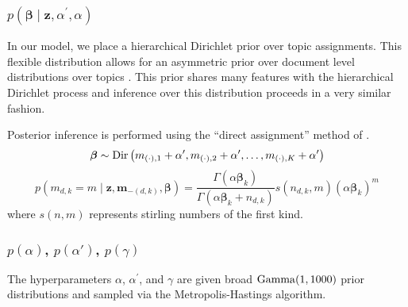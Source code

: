 


\subsubsection{$p\left(\boldsymbol\beta\mid\mathbf{z},\alpha^{\prime},\alpha\right)$}

In our model, we place a hierarchical Dirichlet prior over topic assignments.
This flexible distribution allows for an asymmetric prior over document
level distributions over topics \citep{WallachMiMc2009}. This prior
shares many features with the hierarchical Dirichlet process and inference
over this distribution proceeds in a very similar fashion.

Posterior inference is performed using the {}``direct assignment''
method of \citet{TehJorBea2006}. \begin{equation}
\boldsymbol\beta\sim{\rm Dir}\left(m_{\left(\cdot\right),1}+\alpha^{\prime},m_{\left(\cdot\right),2}+\alpha^{\prime},\ldots,m_{\left(\cdot\right),K}+\alpha^{\prime}\right)\end{equation}
 \begin{equation}
p\left(m_{d,k}=m\mid\mathbf{z},\mathbf{m}_{-\left(d,k\right)},\boldsymbol\beta\right)=\frac{\Gamma\left(\alpha\boldsymbol\beta_{k}\right)}{\Gamma\left(\alpha\boldsymbol\beta_{k}+n_{d,k}\right)}s\left(n_{d,k},m\right)\left(\alpha\boldsymbol\beta_{k}\right)^{m}\end{equation}
 where $s\left(n,m\right)$ represents stirling numbers of the first
kind. 


\subsubsection{$p\left(\alpha\right)$, $p\left(\alpha'\right)$, $p\left(\gamma\right)$}

The hyperparameters $\alpha$, $\alpha^{\prime}$, and $\gamma$ are
given broad ${\rm Gamma}(1,1000)$ prior distributions and sampled
via the Metropolis-Hastings algorithm. 

